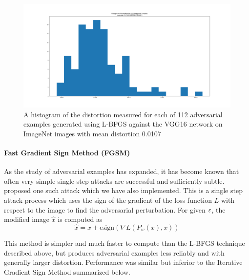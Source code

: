 
\begin{figure}[ht]
\includegraphics[trim=200 80 100 100, clip,width=14cm]{c1_figures/distortion_hist.png}
\caption{A histogram of the distortion measured for each of 112 adversarial examples generated using L-BFGS against the VGG16 network on ImageNet images with mean distortion 0.0107}
\label{lbfgsi}
\end{figure}

\paragraph{Fast Gradient Sign Method (FGSM)} 

As the study of adversarial examples has expanded, it has become known
that often very simple single-step attacks are successful and
sufficiently subtle. ~\citet{goodfellow_explaining_2014} proposed one
such attack which we have also implemented. This is a single step
attack process which uses the sign of the gradient of the loss
function $L$  with respect to the image to find the adversarial
perturbation. For given $\varepsilon$, the modified  image $\hat x$ is
computed as 
\begin{equation}
\hat{x} = x + \epsilon \text{sign} (\nabla L (P_w(x),x))
\end{equation}

This method is simpler and much faster to compute than the L-BFGS technique described above, but produces adversarial examples less reliably and with generally larger distortion. Performance was similar but inferior to the Iterative Gradient Sign Method summarized below.  

